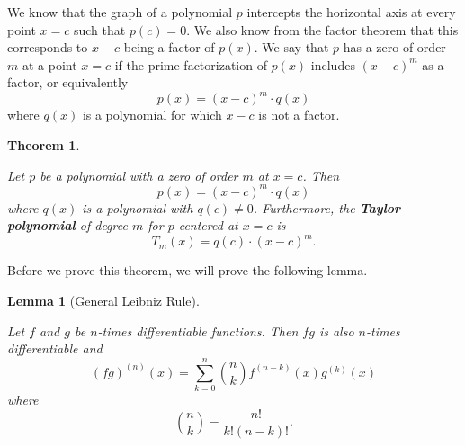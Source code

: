 \documentclass[
]{book}
\newtheorem{theorem}{Theorem}[chapter]
\newtheorem{lemma}{Lemma}[chapter]
\theoremstyle{definition}
\theoremstyle{definition}
\theoremstyle{definition}
\theoremstyle{definition}
\theoremstyle{remark}
\begin{document}
We know that the graph of a polynomial \(p\) intercepts the horizontal axis at every point \(x=c\) such that \(p(c)=0\). We also know from the factor theorem that this corresponds to \(x-c\) being a factor of \(p(x)\). We say that \(p\) has a zero of order \(m\) at a point \(x=c\) if the prime factorization of \(p(x)\) includes \((x-c)^m\) as a factor, or equivalently
\[p(x)=(x-c)^m \cdot q(x)\] where \(q(x)\) is a polynomial for which \(x-c\) is not a factor.

\begin{theorem}
\protect\hypertarget{thm:poly-Taylor-zero}{}\label{thm:poly-Taylor-zero}

Let \(p\) be a polynomial with a zero of order \(m\) at \(x=c\). Then \[p(x)=(x-c)^m \cdot q(x)\] where \(q(x)\) is a polynomial with \(q(c)\neq 0\). Furthermore, the \textbf{Taylor polynomial} of degree \(m\) for \(p\) centered at \(x=c\) is \[T_m(x)= q(c)\cdot (x-c)^m.\]

\end{theorem}

Before we prove this theorem, we will prove the following lemma.

\begin{lemma}[General Leibniz Rule]
\protect\hypertarget{lem:Leibniz-rule}{}\label{lem:Leibniz-rule}

Let \(f\) and \(g\) be \(n\)-times differentiable functions. Then \(fg\) is also \(n\)-times differentiable and
\[(fg)^{(n)} (x) = \sum_{k=0}^n \binom{n}{k} f^{(n-k)}(x) g^{(k)}(x) \] where \[\binom{n}{k} = \frac{n!}{k!(n-k)!}.\]

\end{lemma}
\end{document}
